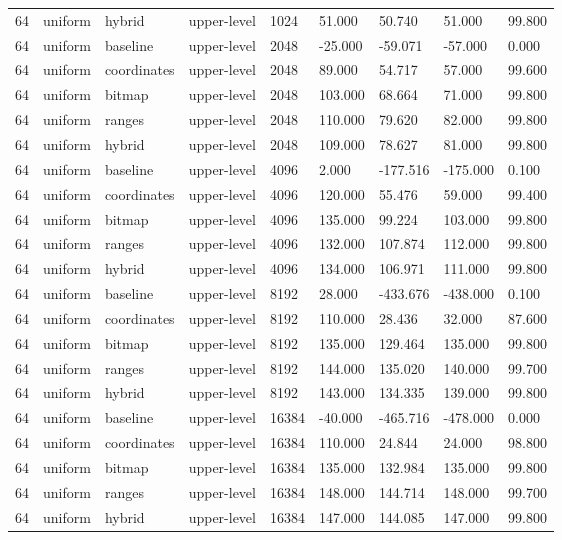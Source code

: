 \begin{tabular}{lllllllll}
64 & uniform & hybrid & upper-level & 1024 & 51.000 & 50.740 & 51.000 & 99.800 \\
64 & uniform & baseline & upper-level & 2048 & -25.000 & -59.071 & -57.000 & 0.000 \\
64 & uniform & coordinates & upper-level & 2048 & 89.000 & 54.717 & 57.000 & 99.600 \\
64 & uniform & bitmap & upper-level & 2048 & 103.000 & 68.664 & 71.000 & 99.800 \\
64 & uniform & ranges & upper-level & 2048 & 110.000 & 79.620 & 82.000 & 99.800 \\
64 & uniform & hybrid & upper-level & 2048 & 109.000 & 78.627 & 81.000 & 99.800 \\
64 & uniform & baseline & upper-level & 4096 & 2.000 & -177.516 & -175.000 & 0.100 \\
64 & uniform & coordinates & upper-level & 4096 & 120.000 & 55.476 & 59.000 & 99.400 \\
64 & uniform & bitmap & upper-level & 4096 & 135.000 & 99.224 & 103.000 & 99.800 \\
64 & uniform & ranges & upper-level & 4096 & 132.000 & 107.874 & 112.000 & 99.800 \\
64 & uniform & hybrid & upper-level & 4096 & 134.000 & 106.971 & 111.000 & 99.800 \\
64 & uniform & baseline & upper-level & 8192 & 28.000 & -433.676 & -438.000 & 0.100 \\
64 & uniform & coordinates & upper-level & 8192 & 110.000 & 28.436 & 32.000 & 87.600 \\
64 & uniform & bitmap & upper-level & 8192 & 135.000 & 129.464 & 135.000 & 99.800 \\
64 & uniform & ranges & upper-level & 8192 & 144.000 & 135.020 & 140.000 & 99.700 \\
64 & uniform & hybrid & upper-level & 8192 & 143.000 & 134.335 & 139.000 & 99.800 \\
64 & uniform & baseline & upper-level & 16384 & -40.000 & -465.716 & -478.000 & 0.000 \\
64 & uniform & coordinates & upper-level & 16384 & 110.000 & 24.844 & 24.000 & 98.800 \\
64 & uniform & bitmap & upper-level & 16384 & 135.000 & 132.984 & 135.000 & 99.800 \\
64 & uniform & ranges & upper-level & 16384 & 148.000 & 144.714 & 148.000 & 99.700 \\
64 & uniform & hybrid & upper-level & 16384 & 147.000 & 144.085 & 147.000 & 99.800 \\

\end{tabular}
